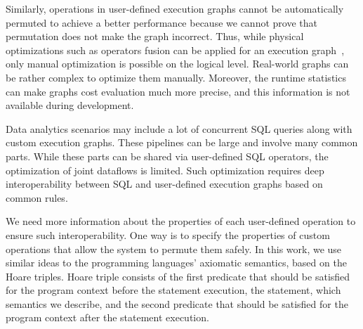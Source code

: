 Similarly, operations in user-defined execution graphs cannot be automatically permuted to achieve a better performance because we cannot prove that permutation does not make the graph incorrect. Thus, while physical optimizations such as operators fusion can be applied for an execution graph~\cite{grulich2020grizzly}, only manual optimization is possible on the logical level. Real-world graphs can be rather complex to optimize them manually. Moreover, the runtime statistics can make graphs cost evaluation much more precise, and this information is not available during development.





Data analytics scenarios may include a lot of concurrent SQL queries along with custom execution graphs. These pipelines can be large and involve many common parts. While these parts can be shared via user-defined SQL operators, the optimization of joint dataflows is limited. Such optimization requires deep interoperability between SQL and user-defined execution graphs based on common rules. 

We need more information about the properties of each user-defined operation to ensure such interoperability. One way is to specify the properties of custom operations that allow the system to permute them safely. In this work, we use similar ideas to the programming languages' axiomatic semantics, based on the Hoare triples. Hoare triple consists of the first predicate that should be satisfied for the program context before the statement execution, the statement, which semantics we describe, and the second predicate that should be satisfied for the program context after the statement execution.

